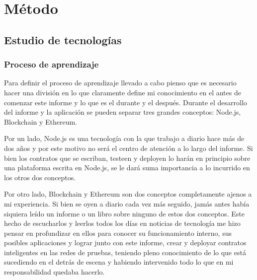 \chapter{Método}

\ifpdf
    \graphicspath{{Chapter3/Figs/Raster/}{Chapter3/Figs/PDF/}{Chapter3/Figs/}}
\else
    \graphicspath{{Chapter3/Figs/}{Chapter3/Figs/}}
\fi

\section{Estudio de tecnologías}

\subsection{Proceso de aprendizaje}

Para definir el proceso de aprendizaje llevado a cabo pienso que es necesario hacer una división en
lo que claramente define mi conocimiento en el antes de comenzar este informe y lo que es el
durante y el después. Durante el desarrollo del informe y la aplicación se pueden separar tres
grandes conceptos: Node.js, Blockchain y Ethereum.

Por un lado, Node.js es una tecnología con la que trabajo a diario hace más de dos años y por este
motivo no será el centro de atención a lo largo del informe. Si bien los contratos que se escriban, 
testeen y deployen lo harán en principio sobre una plataforma escrita en Node.js, se le dará suma
importancia a lo incurrido en los otros dos conceptos.

Por otro lado, Blockchain y Ethereum son dos conceptos completamente ajenos a mi experiencia. Si 
bien se oyen a diario cada vez más seguido, jamás antes había siquiera leído un informe o un libro
sobre ninguno de estos dos conceptos. Este hecho de escucharlos y leerlos todos los días en 
noticias de tecnología me hizo pensar en profundizar en ellos para conocer su funcionamiento 
interno, sus posibles aplicaciones y lograr junto con este informe, crear y deployar contratos 
inteligentes en las redes de pruebas, teniendo pleno conocimiento de lo que está sucediendo en el 
detrás de escena y habiendo intervenido todo lo que en mi responsabilidad quedaba hacerlo.

